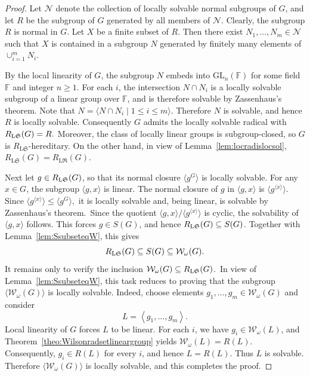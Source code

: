 \documentclass[11pt, reqno]{amsart}
\numberwithin{equation}{section}
\theoremstyle{definition}
\newcommand{\LS}{\textup{L}\mathfrak{S}}
\numberwithin{equation}{section}
\begin{document}
\begin{proof}
Let $\mathcal{N}$ denote the collection of locally solvable normal subgroups of $G$, and let $R$ be the subgroup of $G$ generated by all members of $\mathcal{N}$.
Clearly, the subgroup $R$ is normal in $G$. 
Let $X$ be a finite subset of $R$. Then there exist $N_1,\ldots,N_m\in\mathcal{N}$ such that $X$ is contained in a subgroup $N$ generated by finitely many elements of $\cup_{i=1}^{m}N_i.$

By the local linearity of $G$, the subgroup $N$ embeds into $\mathrm{GL}_n(\mathbb{F})$ for some field $\mathbb{F}$ and integer $n \geq 1$.    
For each $i$, the intersection $N\cap N_i$ is a locally solvable subgroup of a linear group over $\mathbb{F}$, and is therefore solvable by Zassenhaus's theorem. Note that $N=\bigl\langle N \cap N_i \mid 1 \leq i\leq m \bigr\rangle.$  Therefore $N$ is solvable, and hence $R$ is locally solvable. Consequently  $G$ admits the locally solvable radical with $R_{\textup{L}\mathfrak{S}}(G)=R.$       
Moreover, the class of locally linear groups is subgroup-closed, so $G$ is $R_{\mathrm{L}\mathfrak{S}}$-hereditary. On the other hand, in view of Lemma~\ref{lem:locradislocsol}, 
$R_{\mathrm{L}\mathfrak{S}}(G)=R_{\mathrm{L}\mathfrak{R}}(G).$ 

Next let $g \in R_{\LS}(G)$, so that its normal closure $\langle g^G \rangle$ is locally solvable. For any $x \in G$, the subgroup $\langle g, x \rangle$ is  linear. The normal closure of $g$ in $\langle g,x\rangle$ is $\langle g^{\langle x\rangle}\rangle$. Since
$\langle g^{\langle x\rangle}\rangle \leq \langle g^G\rangle,$ it is locally solvable and, being linear, is solvable by Zassenhaus's theorem.~Since the quotient $\langle g, x \rangle/\langle g^{\langle x \rangle} \rangle$ is cyclic, the solvability of $\langle g, x \rangle$ follows. This forces $g \in S(G)$, and hence $R_{\LS}(G) \subseteq S(G)$. Together with Lemma~\ref{lem:SsubseteqW}, this gives
$$R_{\LS}(G)
\subseteq
S(G)
\subseteq
\mathcal{W}_{\omega}(G).$$
It remains only to verify the inclusion $\mathcal{W}_{\omega}(G) \subseteq R_{\LS}(G)$.~In view of Lemma~\ref{lem:SsubseteqW}, this task reduces to proving that the subgroup $\langle \mathcal{W}_{\omega}(G) \rangle$ is locally solvable. Indeed, choose elements $g_1, \dots, g_m \in \mathcal{W}_\omega(G)$ and consider $$L = \left\langle g_1, \dots, g_m \right\rangle.$$ Local linearity of $G$ forces $L$ to be linear. For each $i$, we have $g_i\in\mathcal{W}_\omega(L)$, and Theorem~\ref{theo:Wilsonradsetlineargroup} yields $\mathcal{W}_\omega(L)=R(L)$. Consequently, $g_i\in R(L)$ for every $i$, and hence $L=R(L)$. Thus $L$ is solvable. Therefore $\langle\mathcal{W}_{\omega}(G)\rangle$ is locally solvable, and this completes the proof.
\end{proof}
\end{document}
